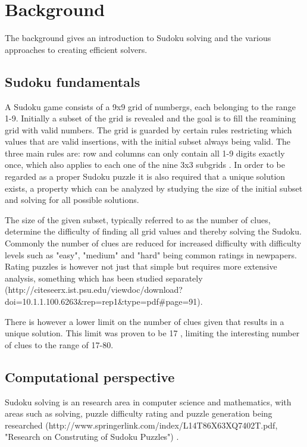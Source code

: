 \documentclass[a4paper,11pt]{kth-mag}
\begin{document}
\chapter{Background}
The background gives an introduction to Sudoku solving and the various approaches to creating efficient solvers.

\section{Sudoku fundamentals}
A Sudoku game consists of a 9x9 grid of numbergs, each belonging to the range 1-9.
Initially a subset of the grid is revealed and the goal is to fill the reamining grid with valid numbers.
The grid is guarded by certain rules restricting which values that are valid insertions, with the initial subset always being valid.
The three main rules are: row and columns can only contain all 1-9 digits exactly once, which also applies to each one of the nine 3x3 subgrids \cite{17clueProof}.
In order to be regarded as a proper Sudoku puzzle it is also required that a unique solution exists, a property which can be analyzed by studying the size of the initial subset and solving for all possible solutions.

The size of the given subset, typically referred to as the number of clues, determine the difficulty of finding all grid values and thereby solving the Sudoku.
Commonly the number of clues are reduced for increased difficulty with difficulty levels such as "easy", "medium" and "hard" being common ratings in newpapers.
Rating puzzles is however not just that simple but requires more extensive analysis, something which has been studied separately (http://citeseerx.ist.psu.edu/viewdoc/download?doi=10.1.1.100.6263\&rep=rep1\&type=pdf\#page=91).

There is however a lower limit on the number of clues given that results in a unique solution.
This limit was proven to be 17 \cite{17clueProof}, limiting the interesting number of clues to the range of 17-80.

\section{Computational perspective}
Sudoku solving is an research area in computer science and mathematics, with areas such as solving, puzzle difficulty rating and puzzle generation being researched \cite{stochastic}(http://www.springerlink.com/index/L14T86X63XQ7402T.pdf, "Research on Construting of Sudoku Puzzles") \cite{generation}.
\end{document}
